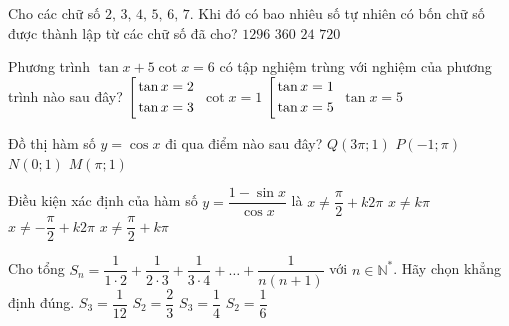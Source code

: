 \begin{ex}%
	Cho các chữ số $2,\,3,\,4,\,5,\,6,\,7.$ Khi đó có bao nhiêu số tự nhiên có bốn chữ số được thành lập từ các chữ số đã cho?
	\choice
	{$1296$}
	{\True $360$}
	{$24$}
	{$720$}
\end{ex}

\begin{ex}%
	Phương trình $\tan x +5\cot x=6$ có tập nghiệm trùng với nghiệm của phương trình nào sau đây?
	\choice
	{$\left[\begin{aligned}&\tan x=2\\&\tan x=3\end{aligned}\right.$}
	{$\cot x=1$}
	{\True $\left[\begin{aligned}&\tan x=1\\& \tan x=5\end{aligned}\right.$}
	{$\tan x=5$}
\end{ex}

\begin{ex}%
	Đồ thị hàm số $y=\cos x$ đi qua điểm nào sau đây?
	\choice
	{$Q(3\pi; 1)$}
	{$P(-1;\pi)$}
	{\True $N(0;1)$}
	{$M(\pi;1)$}
\end{ex}

\begin{ex}%
	Điều kiện xác định của hàm số $y=\dfrac{1-\sin x}{\cos x}$ là
	\choice
	{$x\ne\dfrac{\pi}{2}+k2\pi$}
	{$x\ne k\pi$}
	{$x\ne -\dfrac{\pi}{2}+k2\pi$}
	{\True $x\ne\dfrac{\pi}{2}+k\pi$}
\end{ex}

\begin{ex}%
	Cho tổng $S_n=\dfrac{1}{1\cdot 2}+\dfrac{1}{2\cdot 3}+\dfrac{1}{3\cdot4}+\ldots +\dfrac{1}{n(n+1)}$ với $n\in \mathbb{N^*}$. Hãy chọn khẳng định đúng.
	\choice
	{$S_3=\dfrac{1}{12}$}
	{\True $S_2=\dfrac{2}{3}$}
	{$S_3=\dfrac{1}{4}$}
	{$S_2=\dfrac{1}{6}$}
\end{ex}


